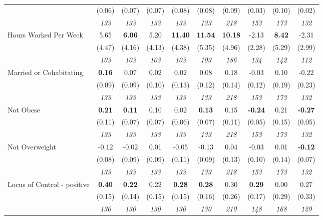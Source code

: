 \begin{tabular}{l c c c c c c c c c}
& (0.06) & (0.07) & (0.07) & (0.08) & (0.08) & (0.09) & (0.03) & (0.10) & (0.02) \\
& \textit{ 133 } & \textit{ 133 } & \textit{ 133 } & \textit{ 133 } & \textit{ 133 } & \textit{ 218 } & \textit{ 153 } & \textit{ 173 } & \textit{ 132 } \\
Hours Worked Per Week & 5.65 & \textbf{ 6.06 } & 5.20 & \textbf{11.40} & \textbf{11.54} & \textbf{ 10.18 } & -2.13 & \textbf{ 8.42 } & -2.31 \\
& (4.47) & (4.16) & (4.13) & (4.38) & (5.35) & (4.96) & (2.28) & (5.29) & (2.99) \\
& \textit{ 103 } & \textit{ 103 } & \textit{ 103 } & \textit{ 103 } & \textit{ 103 } & \textit{ 186 } & \textit{ 134 } & \textit{ 142 } & \textit{ 112 } \\
Married or Cohabitating & \textbf{ 0.16 } & 0.07 & 0.02 & 0.02 & 0.08 & 0.18 & -0.03 & 0.10 & -0.22 \\
& (0.09) & (0.09) & (0.10) & (0.13) & (0.12) & (0.14) & (0.12) & (0.19) & (0.23) \\
& \textit{ 133 } & \textit{ 133 } & \textit{ 133 } & \textit{ 133 } & \textit{ 133 } & \textit{ 218 } & \textit{ 153 } & \textit{ 173 } & \textit{ 132 } \\
Not Obese & \textbf{ 0.21 } & \textbf{ 0.11 } & 0.10 & 0.02 & \textbf{0.13} & 0.15 & \textbf{-0.24} & 0.21 & \textbf{-0.27} \\
& (0.11) & (0.07) & (0.07) & (0.06) & (0.07) & (0.11) & (0.05) & (0.15) & (0.05) \\
& \textit{ 133 } & \textit{ 133 } & \textit{ 133 } & \textit{ 133 } & \textit{ 133 } & \textit{ 218 } & \textit{ 153 } & \textit{ 173 } & \textit{ 132 } \\
Not Overweight & -0.12 & -0.02 & 0.01 & -0.05 & -0.13 & 0.04 & -0.03 & 0.01 & \textbf{-0.12} \\
& (0.08) & (0.09) & (0.09) & (0.11) & (0.09) & (0.13) & (0.10) & (0.14) & (0.07) \\
& \textit{ 133 } & \textit{ 133 } & \textit{ 133 } & \textit{ 133 } & \textit{ 133 } & \textit{ 218 } & \textit{ 153 } & \textit{ 173 } & \textit{ 132 } \\
Locus of Control - positive & \textbf{ 0.40 } & \textbf{ 0.22 } & 0.22 & \textbf{0.28} & \textbf{0.28} & 0.30 & \textbf{0.29} & 0.00 & 0.27 \\
& (0.15) & (0.14) & (0.15) & (0.15) & (0.16) & (0.26) & (0.17) & (0.29) & (0.33) \\
& \textit{ 130 } & \textit{ 130 } & \textit{ 130 } & \textit{ 130 } & \textit{ 130 } & \textit{ 210 } & \textit{ 148 } & \textit{ 168 } & \textit{ 129 } \\

\end{tabular}
